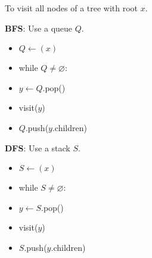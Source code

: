 \documentclass[12pt]{amsart}
\renewcommand{\emptyset}{\varnothing}
\begin{document}
To visit all nodes of a tree with root $x$.\\[1ex]

\noindent
\begin{minipage}{0.45\linewidth}
  \textbf{BFS}: Use a queue $Q$.
  \begin{itemize}
  \item $Q \gets (x)$
  \item while $Q \neq \emptyset$:
  \item[] \quad $y \gets Q$.pop()
  \item[] \quad visit($y$)
  \item[] \quad $Q$.push($y$.children)
  \end{itemize}
\end{minipage}
\hfill
\begin{minipage}{0.45\linewidth}
  \textbf{DFS}: Use a stack $S$.
  \begin{itemize}
  \item $S \gets (x)$
  \item while $S \neq \emptyset$:
  \item[] \quad $y \gets S$.pop()
  \item[] \quad visit($y$)
  \item[] \quad $S$.push($y$.children)
  \end{itemize}
\end{minipage}
\end{document}
